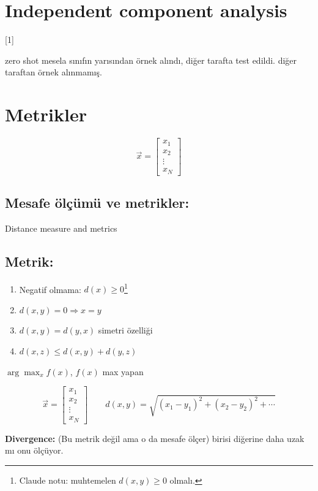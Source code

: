 \documentclass[11pt,a4paper]{article}
\begin{document}

\section{Independent component analysis}
[1]

zero shot \quad mesela sınıfın yarısından örnek alındı, diğer tarafta test edildi. diğer taraftan örnek alınmamış.

\section{Metrikler}
\[ \vec{x} = \begin{bmatrix} x_1 \\ x_2 \\ \vdots \\ x_N \end{bmatrix} \]

\subsection{Mesafe ölçümü ve metrikler:}
\textcolor{kirmizikalem}{Distance measure and metrics}

\subsection{Metrik:}
\begin{enumerate}[label=\textcircled{\small\arabic*}]
\item Negatif olmama: $d(x) \ge 0$\footnote{Claude notu: muhtemelen $d(x,y)\ge 0$ olmalı.}
\item $d(x,y)=0 \Rightarrow x=y$
\item $d(x,y)=d(y,x)$ \quad simetri özelliği
\item $d(x,z) \le d(x,y)+d(y,z)$
\end{enumerate}

$\arg\max_x f(x)$, $f(x)$ max yapan

\[ \vec{x} = \begin{bmatrix} x_1 \\ x_2 \\ \vdots \\ x_N \end{bmatrix} \qquad d(x,y) = \sqrt{(x_1-y_1)^2+(x_2-y_2)^2+\cdots} \]

\textbf{Divergence:} (Bu metrik değil ama o da mesafe ölçer) birisi diğerine daha uzak mı onu ölçüyor.
\end{document}
